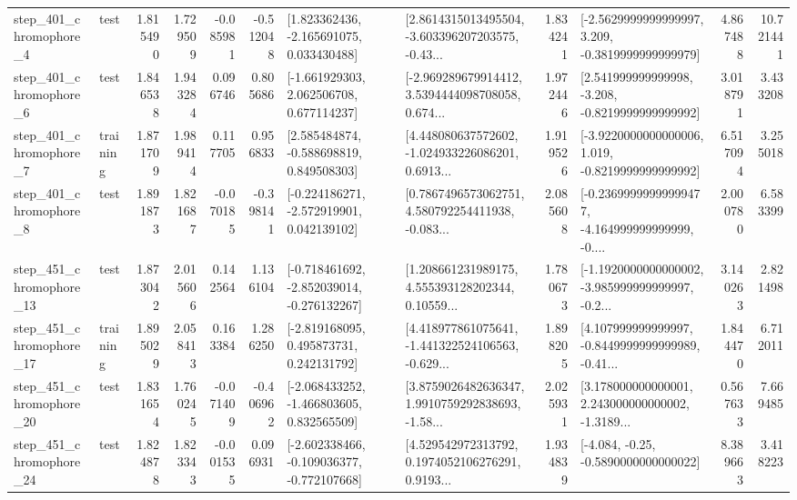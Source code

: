 \begin{tabular}{llrrrrllrlrr}
   step\_401\_chromophore\_4 &      test &      1.815490 &    1.729509 &     -0.085981 & -0.512048 &    [1.823362436, -2.165691075, 0.033430488] &  [2.8614315013495504, -3.603396207203575, -0.43... &       1.834241 &  [-2.5629999999999997, 3.209, -0.3819999999999979] &            4.867488 &         10.721441 \\
   step\_401\_chromophore\_6 &      test &      1.846538 &    1.943284 &      0.096746 &  0.805686 &    [-1.661929303, 2.062506708, 0.677114237] &  [-2.969289679914412, 3.5394444098708058, 0.674... &       1.972446 &   [2.541999999999998, -3.208, -0.8219999999999992] &            3.018791 &          3.433208 \\
   step\_401\_chromophore\_7 &  training &      1.871709 &    1.989414 &      0.117705 &  0.956833 &    [2.585484874, -0.588698819, 0.849508303] &  [4.448080637572602, -1.024933226086201, 0.6913... &       1.919526 &  [-3.9220000000000006, 1.019, -0.8219999999999992] &            6.517094 &          3.255018 \\
   step\_401\_chromophore\_8 &      test &      1.891873 &    1.821687 &     -0.070185 & -0.398141 &   [-0.224186271, -2.572919901, 0.042139102] &  [0.7867496573062751, 4.580792254411938, -0.083... &       2.085608 &  [-0.23699999999999477, -4.164999999999999, -0.... &            2.000780 &          6.583399 \\
  step\_451\_chromophore\_13 &      test &      1.873042 &    2.015606 &      0.142564 &  1.136104 &  [-0.718461692, -2.852039014, -0.276132267] &  [1.208661231989175, 4.555393128202344, 0.10559... &       1.780673 &  [-1.1920000000000002, -3.985999999999997, -0.2... &            3.140263 &          2.821498 \\
  step\_451\_chromophore\_17 &  training &      1.895029 &    2.058413 &      0.163384 &  1.286250 &    [-2.819168095, 0.495873731, 0.242131792] &  [4.418977861075641, -1.441322524106563, -0.629... &       1.898205 &  [4.107999999999997, -0.8449999999999989, -0.41... &            1.844470 &          6.712011 \\
  step\_451\_chromophore\_20 &      test &      1.831654 &    1.760245 &     -0.071409 & -0.406962 &   [-2.068433252, -1.466803605, 0.832565509] &  [3.8759026482636347, 1.9910759292838693, -1.58... &       2.025931 &  [3.178000000000001, 2.243000000000002, -1.3189... &            0.567633 &          7.669485 \\
  step\_451\_chromophore\_24 &      test &      1.824878 &    1.823343 &     -0.001535 &  0.096931 &  [-2.602338466, -0.109036377, -0.772107668] &  [4.529542972313792, 0.1974052106276291, 0.9193... &       1.934839 &               [-4.084, -0.25, -0.5890000000000022] &            8.389663 &          3.418223 \\

\end{tabular}
